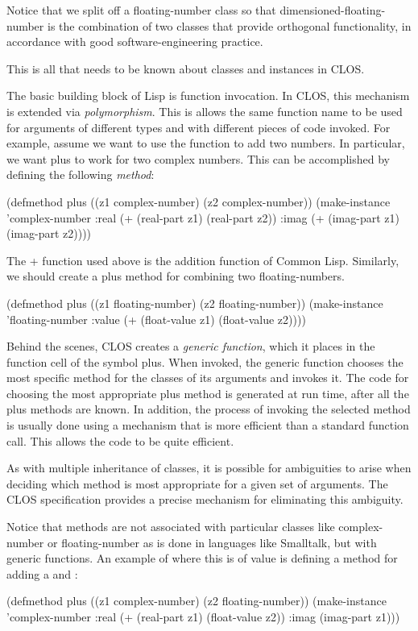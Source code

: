 Notice that we split off a {\sf floating-number} class so that {\sf
dimensioned-floating-number} is the combination of two classes that
provide orthogonal functionality, in accordance with good
software-engineering practice. 
  
This is all that needs to be known about classes and instances in
CLOS.

\medskip
The basic building block of Lisp is function invocation.  In CLOS,
this mechanism is extended via {\em polymorphism}.  This is allows the
same function name to be used for arguments of different types and
with different pieces of code invoked.  For example, assume we want to
use the function  to add two numbers.  In particular, we
want {\sf plus} to work for two complex numbers.  This can be
accomplished by defining the following {\em method\/}:
\begin{code}
(defmethod plus ((z1 complex-number) (z2 complex-number))
  (make-instance 'complex-number 
                 :real (+ (real-part z1) (real-part z2))
                 :imag (+ (imag-part z1) (imag-part z2))))
\end{code}

\noindent
The {\sf +} function used above is the addition function of Common
Lisp.   Similarly, we should create a {\sf plus} method for combining
two {\sf floating-number}s.
\begin{code}
(defmethod plus ((z1 floating-number) (z2 floating-number))
  (make-instance 'floating-number  
                 :value (+ (float-value z1) (float-value z2))))
\end{code}
  
Behind the scenes, CLOS creates a {\em generic function}, which it
places in the function cell of the symbol {\sf plus}.  When invoked,
the generic function chooses the most specific method for the classes
of its arguments and invokes it. The code for choosing the most
appropriate {\sf plus} method is generated at run time, after all the
{\sf plus} methods are known. In addition, the process of invoking the
selected method is usually done using a mechanism that is more
efficient than a standard function call. This allows the code to be
quite efficient.
  
As with multiple inheritance of classes, it is possible for
ambiguities to arise when deciding which method is most appropriate
for a given set of arguments. The CLOS specification provides a
precise mechanism for eliminating this ambiguity.
  
Notice that methods are not associated with particular classes like
complex-number or floating-number as is done in languages like
Smalltalk, but with generic functions.  An example of where this is of
value is defining a method for adding a  and
:
\begin{code}
(defmethod plus ((z1 complex-number) (z2 floating-number))
  (make-instance 'complex-number 
                 :real (+ (real-part z1) (float-value z2)) 
                 :imag (imag-part z1)))
\end{code}
  
